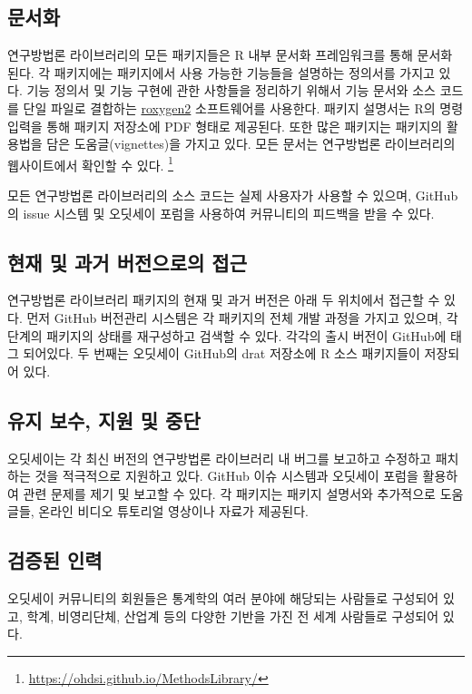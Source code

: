 \documentclass[10.5pt]{book}
\let\rmarkdownfootnote\footnote%
\def\footnote{\protect\rmarkdownfootnote}
\theoremstyle{definition}
\theoremstyle{definition}
\theoremstyle{definition}
\theoremstyle{remark}
\begin{document}
\subsection{문서화}\label{-1}

연구방법론 라이브러리의 모든 패키지들은 R 내부 문서화 프레임워크를 통해
문서화 된다. 각 패키지에는 패키지에서 사용 가능한 기능들을 설명하는
정의서를 가지고 있다. 기능 정의서 및 기능 구현에 관한 사항들을 정리하기
위해서 기능 문서와 소스 코드를 단일 파일로 결합하는
\href{https://cran.r-project.org/web/packages/roxygen2/vignettes/roxygen2.html}{roxygen2}
소프트웨어를 사용한다. 패키지 설명서는 R의 명령 입력을 통해 패키지
저장소에 PDF 형태로 제공된다. 또한 많은 패키지는 패키지의 활용법을 담은
도움글(vignettes)을 가지고 있다. 모든 문서는 연구방법론 라이브러리의
웹사이트에서 확인할 수 있다. \footnote{\url{https://ohdsi.github.io/MethodsLibrary/}}

모든 연구방법론 라이브러리의 소스 코드는 실제 사용자가 사용할 수 있으며,
GitHub의 issue 시스템 및 오딧세이 포럼을 사용하여 커뮤니티의 피드백을
받을 수 있다.

\subsection{현재 및 과거 버전으로의 접근}\label{----}

연구방법론 라이브러리 패키지의 현재 및 과거 버전은 아래 두 위치에서
접근할 수 있다. 먼저 GitHub 버전관리 시스템은 각 패키지의 전체 개발
과정을 가지고 있으며, 각 단계의 패키지의 상태를 재구성하고 검색할 수
있다. 각각의 출시 버전이 GitHub에 태그 되어있다. 두 번째는 오딧세이
GitHub의 drat 저장소에 R 소스 패키지들이 저장되어 있다.

\subsection{유지 보수, 지원 및 중단}\label{----}

오딧세이는 각 최신 버전의 연구방법론 라이브러리 내 버그를 보고하고
수정하고 패치하는 것을 적극적으로 지원하고 있다. GitHub 이슈 시스템과
오딧세이 포럼을 활용하여 관련 문제를 제기 및 보고할 수 있다. 각 패키지는
패키지 설명서와 추가적으로 도움글들, 온라인 비디오 튜토리얼 영상이나
자료가 제공된다.

\subsection{검증된 인력}\label{-}

오딧세이 커뮤니티의 회원들은 통계학의 여러 분야에 해당되는 사람들로
구성되어 있고, 학계, 비영리단체, 산업계 등의 다양한 기반을 가진 전 세계
사람들로 구성되어 있다.
\end{document}

